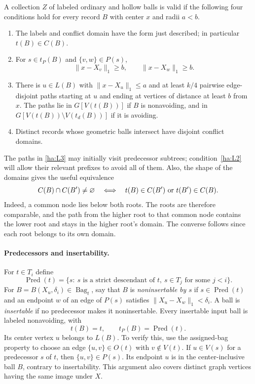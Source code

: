 \begin{definition}\label{ha:valid-labeling}
A collection $Z$ of labeled ordinary and hollow balls is valid if the
following four conditions hold for every record $B$ with center $x$
and radii $a<b$.
\begin{enumerate}
 \renewcommand{\theenumi}{L\arabic{enumi}}
 \renewcommand{\labelenumi}{(\theenumi)}
 \item\label{ha:L1} The labels and conflict domain have the form just
 described; in particular $t(B)\in C(B)$.
 \item\label{ha:L2} For $s\in t_P(B)$ and $\{v,w\}\in P(s)$,
 \[
       \|x-X_v\|_1\ge b,\qquad \|x-X_w\|_1\ge b.
 \]
 \item\label{ha:L3} There is $u\in L(B)$ with $\|x-X_u\|_1\le a$
 and at least $k/4$ pairwise edge-disjoint paths starting at $u$ and
 ending at vertices of distance at least $b$ from $x$.  The paths lie
 in $G[V(t(B))]$ if $B$ is nonavoiding, and in
 $G[V(t(B))\setminus V(t_d(B))]$ if it is avoiding.
 \item\label{ha:L4} Distinct records whose geometric balls intersect
 have disjoint conflict domains.
\end{enumerate}
\end{definition}

The paths in \ref{ha:L3} may initially visit predecessor subtrees;
condition~\ref{ha:L2} will allow their relevant prefixes to avoid all
of them.  Also, the shape of the domains gives the useful equivalence
\begin{equation}\label{ha:domain-root-test}
 C(B)\cap C(B')\ne\varnothing
 \quad\Longleftrightarrow\quad
 t(B)\in C(B')\ \hbox{or}\ t(B')\in C(B).
\end{equation}
Indeed, a common node lies below both roots.  The roots are therefore
comparable, and the path from the higher root to that common node
contains the lower root and stays in the higher root's domain.
The converse follows since each root belongs to its own domain.

\paragraph{Predecessors and insertability.}
For $t\in T_i$ define
\[
 \operatorname{Pred}(t)=
 \{s:\ s\text{ is a strict descendant of }t,
                  \ s\in T_j\text{ for some }j<i\}.
\]
For $B=B(X_u,\delta_i)\in\operatorname{Bag}_t$, say that $B$ is
\emph{noninsertable by $s$} if $s\in\operatorname{Pred}(t)$ and an
endpoint $w$ of an edge of $P(s)$ satisfies
$\|X_u-X_w\|_1<\delta_i$.  A ball is \emph{insertable} if no
predecessor makes it noninsertable.  Every insertable input ball is
labeled nonavoiding, with
\[
       t(B)=t,\qquad t_P(B)=\operatorname{Pred}(t).
\]
Its center vertex $u$ belongs to $L(B)$.  To verify this, use the
assigned-bag property to choose an edge $\{u,v\}\in O(t)$ with
$v\notin V(t)$.  If $u\in V(s)$ for a predecessor $s$ of $t$, then
$\{u,v\}\in P(s)$.  Its endpoint $u$ is in the center-inclusive
ball $B$, contrary to insertability.  This argument also covers
distinct graph vertices having the same image under $X$.


